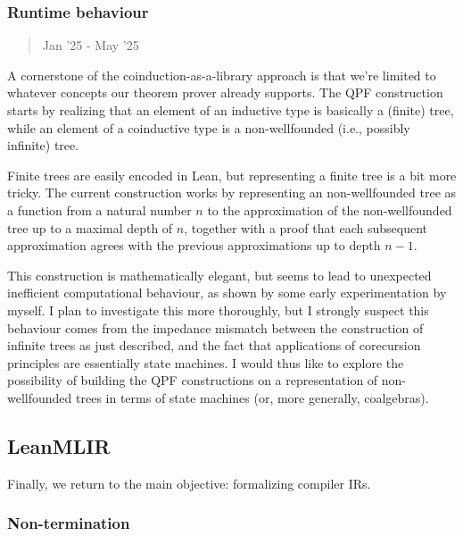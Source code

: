 \documentclass[a4paper]{article}
\begin{document}
\hypertarget{runtime-behaviour}{%
\subsubsection{Runtime behaviour}\label{runtime-behaviour}}

\begin{quote}
Jan '25 - May '25
\end{quote}

A cornerstone of the coinduction-as-a-library approach is that we're
limited to whatever concepts our theorem prover already supports. The
QPF construction starts by realizing that an element of an inductive
type is basically a (finite) tree, while an element of a coinductive
type is a non-wellfounded (i.e., possibly infinite) tree.

Finite trees are easily encoded in Lean, but representing a finite tree
is a bit more tricky. The current construction works by representing an
non-wellfounded tree as a function from a natural number \(n\) to the
approximation of the non-wellfounded tree up to a maximal depth of
\(n\), together with a proof that each subsequent approximation agrees
with the previous approximations up to depth \(n-1\).

This construction is mathematically elegant, but seems to lead to
unexpected inefficient computational behaviour, as shown by some early
experimentation by myself. I plan to investigate this more thoroughly,
but I strongly suspect this behaviour comes from the impedance mismatch
between the construction of infinite trees as just described, and the
fact that applications of corecursion principles are essentially state
machines. I would thus like to explore the possibility of building the
QPF constructions on a representation of non-wellfounded trees in terms
of state machines (or, more generally, coalgebras).

\hypertarget{leanmlir}{%
\subsection{LeanMLIR}\label{leanmlir}}

Finally, we return to the main objective: formalizing compiler IRs.

\hypertarget{non-termination}{%
\subsubsection{Non-termination}\label{non-termination}}
\end{document}

